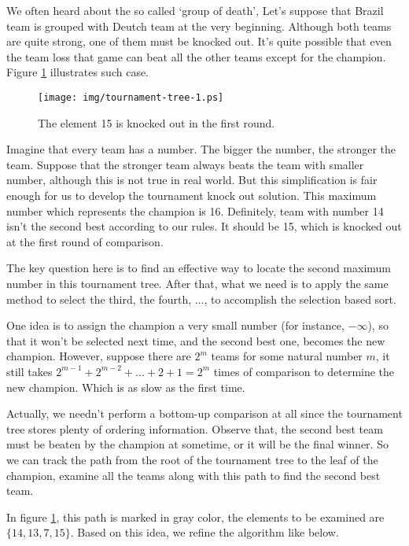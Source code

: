 \documentclass{article}
\begin{document}
We often heard about the so called `group of death', Let's suppose that Brazil team is
grouped with Deutch team at the very beginning. Although both teams are quite strong, one of
them must be knocked out. It's quite possible that even the team loss that game can beat
all the other teams except for the champion. Figure \ref{fig:tournament-tree-1} illustrates such
case.

\begin{figure}[htbp]
  \centering
  \texttt{[image: img/tournament-tree-1.ps]}
  \caption{The element 15 is knocked out in the first round.}
  \label{fig:tournament-tree-1}
\end{figure}

Imagine that every team has a number. The bigger the number, the stronger the team. Suppose
that the stronger team always beats the team with smaller number, although this is not true
in real world. But this simplification is fair enough for us to develop the tournament knock
out solution. This maximum number which represents the champion is 16. Definitely, team with
number 14 isn't the second best according to our rules. It should be 15, which is knocked
out at the first round of comparison.

The key question here is to find an effective way to locate the second maximum number in this
tournament tree. After that, what we need is to apply the same method to select the third,
the fourth, ..., to accomplish the selection based sort.

One idea is to assign the champion a very small number (for instance, $-\infty$),
so that it won't be selected next time, and the second best one, becomes the new champion.
However, suppose there are $2^m$ teams for some natural number $m$, it still takes
$2^{m-1} + 2^{m-2} + ... + 2 + 1 = 2^m$ times of comparison to determine the new
champion. Which is as slow as the first time.

Actually, we needn't perform a bottom-up comparison at all since the tournament tree
stores plenty of ordering information. Observe that, the second best team must
be beaten by the champion at sometime, or it will be the final winner. So we
can track the path from the root of the tournament tree to the leaf of the
champion, examine all the teams along with this path to find the second best team.

In figure \ref{fig:tournament-tree-1}, this path is marked in gray color, the elements
to be examined are $\{14, 13, 7, 15\}$. Based on this idea, we refine the algorithm
like below.
\end{document}

